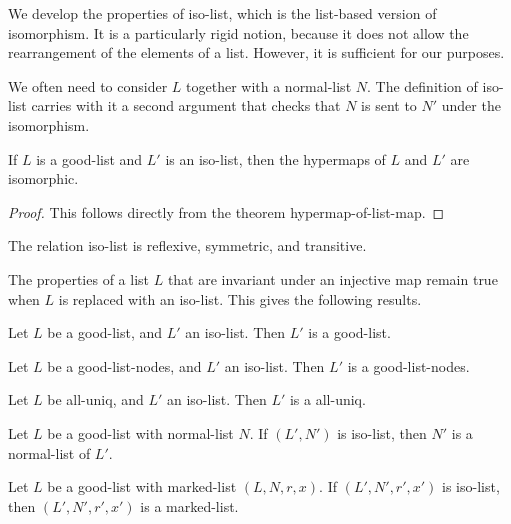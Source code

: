 We develop the properties of iso-list, which is the list-based version of isomorphism.
It is a particularly rigid notion, because it does not allow the rearrangement of the elements of a list.
However, it is sufficient for our purposes.

We often need to consider $L$ together with a normal-list $N$.  The definition of iso-list carries with it
a second argument that checks that $N$ is sent to $N'$ under the isomorphism.

\begin{lemma} If $L$ is a good-list and $L'$ is an iso-list, then the hypermaps of $L$ and $L'$ are isomorphic.
\end{lemma}

\begin{proof} This follows directly from the theorem hypermap-of-list-map.
\end{proof}

\begin{lemma}  The relation iso-list is reflexive, symmetric, and transitive.
\end{lemma}

The properties of a list $L$ that are invariant under an injective map remain true when $L$ is replaced
with an iso-list.  This gives the following results.

\begin{lemma} Let $L$ be a good-list, and $L'$ an iso-list.  Then $L'$ is a good-list.
\end{lemma}

\begin{lemma} Let $L$ be a good-list-nodes, and $L'$ an iso-list.  Then $L'$ is a good-list-nodes.
\end{lemma}

\begin{lemma} Let $L$ be all-uniq, and $L'$ an iso-list.  Then $L'$ is a all-uniq.
\end{lemma}

\begin{lemma}
 Let $L$ be a good-list with normal-list $N$.  If $(L',N')$ is iso-list, then $N'$ is a normal-list of $L'$.
\end{lemma}

\begin{lemma}
Let $L$ be a good-list with marked-list $(L,N,r,x)$.  If $(L',N',r',x')$ is iso-list, then $(L',N',r',x')$ is a marked-list.
\end{lemma}



